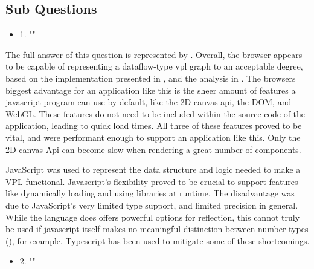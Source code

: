 \subsection*{Sub Questions}

\begin{itemize}[ ]
  \item 1. "\mySubRQOne"
\end{itemize}

The full answer of this question is represented by .
Overall, the browser appears to be capable of representing a dataflow-type vpl graph to an acceptable degree, 
based on the implementation presented in , and the analysis in .
The browsers biggest advantage for an application like this is the sheer amount of features a javascript program can use by default, like the 2D canvas api, the DOM, and WebGL. 
These features do not need to be included within the source code of the application, leading to quick load times. 
All three of these features proved to be vital, and were performant enough to support an application like this. 
Only the 2D canvas Api can become slow when rendering a great number of components. 

JavaScript was used to represent the data structure and logic needed to make a VPL functional. 
Javascript's flexibility proved to be crucial to support features like dynamically loading and using libraries at runtime. 
The disadvantage was due to JavaScript's very limited type support, and limited precision in general. 
While the language does offers powerful options for reflection, this cannot truly be used if javascript itself makes no meaningful distinction between number types (), for example. 
Typescript has been used to mitigate some of these shortcomings.  

\begin{itemize}[ ]
  \item 2. "\mySubRQTwo"
\end{itemize}


